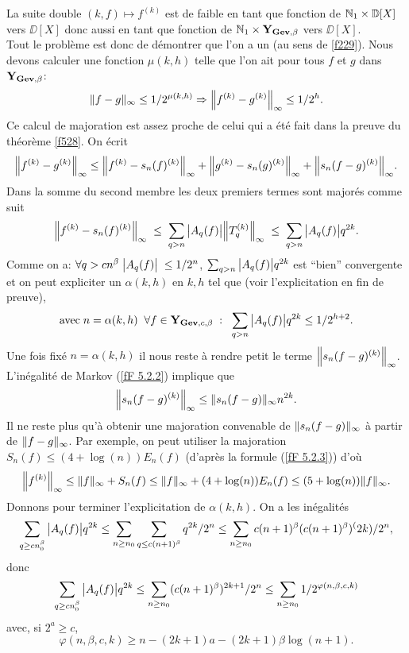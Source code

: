 \proof 
La suite double   $(k,f) \mapsto f^{(k)}$   est de faible \com en tant que 
fonction de  $\mathbb {N}_1 \times  \mathbb {D}[X]$   
vers  $\DD[X]$  donc aussi en tant que fonction de 
 $\mathbb {N}_1 \times {\bf Y}_{{\bf Gev}, \beta}$
  vers  $\DD[X]$. \\
Tout le problème est donc de démontrer que l'on a un \mcu \poll (au sens de 
\ref{f229}).  
Nous devons calculer une fonction  $\mu(k,h)$  telle que l'on ait pour tous $f$ 
et $g$  dans  ${\bf Y}_{{\bf Gev}, \beta}$:
\[
\lVert  f - g  \rVert_\infty \leq 1/2^{\mu (k,h)} \Rightarrow \Big\lVert f^{(k)} - g^{(k)}  \Big\rVert_\infty \leq 1/2^h. 
\] 
Ce calcul de majoration est assez proche de celui qui a été fait dans la 
preuve du théorème \ref{f528}. On écrit   
\[
\Big\lVert f^{(k)} - g^{(k)}  \Big\rVert_\infty \leq \Big\lVert f^{(k)} - s_n(f)^{(k)}  \Big\rVert_{\infty} + \Big\lVert  g^{(k)} - s_n(g)^{(k)}  \Big\rVert_{\infty} + \Big\lVert  s_n(f-g)^{(k)}  \Big\rVert_{\infty}.
\]
Dans la somme du second membre les deux premiers termes sont majorés comme 
suit
\[
\Big\lVert f^{(k)} - s_n(f)^{(k)}  \Big\rVert_{\infty} \;\leq\;\sum_{q>n} \big|{A_q(f)}\big| \Big\lVert  T_q^{(k)}  \Big\rVert_\infty \;\leq\; \sum_{q>n} \big|{A_q(f)}\big| q^{2k}.
\]
Comme on a:  $\forall q > cn^{\beta} \; \big|{A_q(f)}\big|\;  \leq 1/2^n$, 
$\sum_{q>n} \big|{A_q(f)}\big| q^{2k}$ 
est ``bien'' convergente et on peut expliciter un  $\alpha(k,h)$  \poll en 
$k,h$  tel que  (voir l'explicitation en fin de preuve),
\[
\hbox{avec} \; n = \alpha(k,h) \; \; \forall f \in {\bf Y}_{{\bf Gev},c,\beta} \; : \; \; 
\sum_{q>n} \big|{A_q(f)}\big| q^{2k} \leq 1/2^{h+2}.
\]
Une fois fixé  $n = \alpha(k,h)$ il nous reste à rendre petit le terme 
$\Big\lVert  s_n(f-g)^{(k)}  \Big\rVert_{\infty}$. 
L'inégalité de Markov  (\ref{fF 5.2.2}) implique que 
\[
\Big\lVert  s_n(f-g)^{(k)}  \Big\rVert_\infty \leq \lVert  s_n(f-g)  \rVert_{\infty} n^{2k}.
\]
Il ne reste plus qu'à obtenir une majoration convenable de  
$\lVert  s_n(f-g)  \rVert_{\infty}$ à partir de  
$\lVert  f-g  \rVert_{\infty}$.
Par exemple, on peut utiliser la majoration  
$S_n(f) \leq (4+ \log (n)) E_n(f)$ 
  (d'après la formule (\ref{fF 5.2.3})) d'où
\[
\Big\lVert f^{(k)}  \Big\rVert_\infty \leq \lVert f \rVert_\infty + S_n(f) \leq \lVert f \rVert_\infty + (4+ \log (n)) E_n(f) \leq (5+ \log (n)) \lVert f \rVert_\infty.
\]
Donnons pour terminer l'explicitation de $\alpha(k,h)$.  On a les inégalités
\[
\sum_{q \geq cn_0^{\beta}} \big|{A_q(f)}\big| q^{2k} \leq \sum_{n \geq n_0}\sum_{q \leq c(n+1)^{\beta}}q^{2k}/2^n \leq \sum_{n \geq n_0} c(n+1)^{\beta}(c(n+1)^{\beta})^(2k)/2^n,
\]
donc
\[
\sum_{q \geq cn_0^{\beta}} \big|{A_q(f)}\big| q^{2k} \leq \sum_{n \geq n_0} (c(n+1)^{\beta})^{2k+1}/2^n \leq \sum_{n \geq n_0} 1/2^{\varphi (n, \beta ,c, k)}
\]
avec, si  $2^a \geq c$,
\[
\varphi (n, \beta ,c, k) \geq n- (2k+1)a-(2k+1) \beta \log(n+1).
\]
